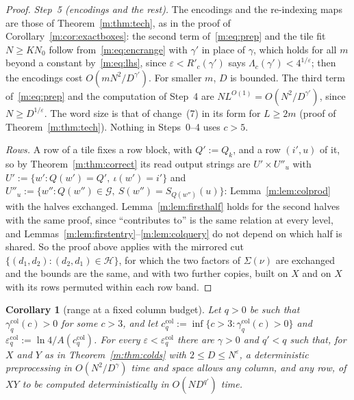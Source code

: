 \documentclass[11pt]{article}
\newtheorem{corollary}[theorem]{Corollary}
\theoremstyle{definition}
\theoremstyle{remark}
\newcommand{\Nz}{N_0}
\newcommand{\Qg}{\mathcal{G}}
\begin{document}
\begin{proof}
\emph{Step~5 (encodings and the rest).} The encodings and the re-indexing maps are those of Theorem~\ref{m:thm:tech}, as in the proof of Corollary~\ref{m:cor:exactboxes}: the second term of~\eqref{m:eq:prep} and the tile fit $N\ge K\Nz$ follow from~\eqref{m:eq:encrange} with $\gamma'$ in place of $\gamma$, which holds for all $m$ beyond a constant by~\eqref{m:eq:lhs}, since $\varepsilon<R'_c(\gamma')$ says $\Lambda_c(\gamma')<4^{1/\varepsilon}$; then the encodings cost $O(mN^2/D^{\gamma'})$. For smaller $m$, $D$ is bounded. The third term of~\eqref{m:eq:prep} and the computation of Step~4 are $NL^{O(1)}=O(N^2/D^{\gamma'})$, since $N\ge D^{1/\varepsilon}$. The word size is that of change~(7) in its form for $L\ge2m$ (proof of Theorem~\ref{m:thm:tech}). Nothing in Steps~0--4 uses $c>5$.

\emph{Rows.} A row of a tile fixes a row block, with $Q':=Q_k$, and a row $(i',u)$ of it, so by Theorem~\ref{m:thm:correct} its read output strings are $U'\times U''_u$ with $U':=\{w':Q(w')=Q',\ \iota(w')=i'\}$ and $U''_u:=\{w'':Q(w'')\in\Qg,\ S(w'')=S_{Q(w'')}(u)\}$: Lemma~\ref{m:lem:colprod} with the halves exchanged. Lemma~\ref{m:lem:firsthalf} holds for the second halves with the same proof, since ``contributes to'' is the same relation at every level, and Lemmas~\ref{m:lem:firstentry}--\ref{m:lem:colquery} do not depend on which half is shared. So the proof above applies with the mirrored cut $\{(d_1,d_2):(d_2,d_1)\in\mathcal H\}$, for which the two factors of $\Sigma(\nu)$ are exchanged and the bounds are the same, and with two further copies, built on $X$ and on $X$ with its rows permuted within each row band.
\end{proof}

\begin{corollary}[range at a fixed column budget]\label{m:cor:colrange}
Let $q>0$ be such that $\gamma^{\mathrm{col}}_q(c)>0$ for some $c>3$, and let $c^{\mathrm{col}}_q:=\inf\{c>3:\gamma^{\mathrm{col}}_q(c)>0\}$ and $\varepsilon^{\mathrm{col}}_q:=\ln4/A(c^{\mathrm{col}}_q)$. For every $\varepsilon<\varepsilon^{\mathrm{col}}_q$ there are $\gamma>0$ and $q'<q$ such that, for $X$ and $Y$ as in Theorem~\ref{m:thm:colds} with $2\le D\le N^\varepsilon$, a deterministic preprocessing in $O(N^2/D^\gamma)$ time and space allows any column, and any row, of $XY$ to be computed deterministically in $O(ND^{q'})$ time.
\end{corollary}
\end{document}
